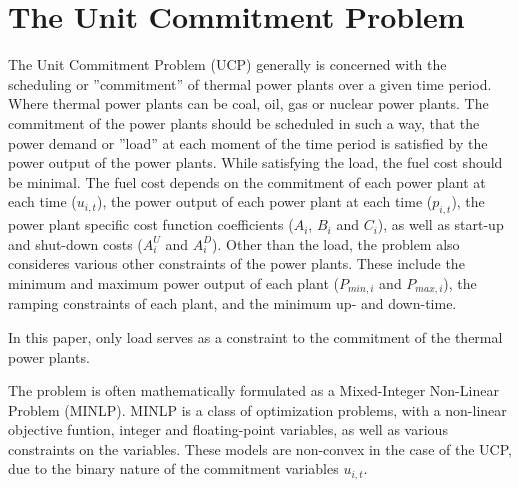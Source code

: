 \section{The Unit Commitment Problem}

The Unit Commitment Problem (UCP) generally is concerned with the scheduling or ''commitment''
of thermal power plants over a given time period.
Where thermal power plants can be coal, oil, gas or nuclear power plants.
The commitment of the power plants should be scheduled in such a way,
that the power demand or ''load'' at each moment of the time period
is satisfied by the power output of the power plants.
While satisfying the load, the fuel cost should be minimal.
The fuel cost depends on the commitment of each power plant at each time ($u_{i, t}$),
the power output of each power plant at each time ($p_{i, t}$),
the power plant specific cost function coefficients ($A_i$, $B_i$ and $C_i$),
as well as start-up and shut-down costs ($A_{i}^{U}$ and $A_{i}^{D}$).
Other than the load, the problem also consideres various other constraints of the power plants.
These include the minimum and maximum power output of each plant ($P_{min,i}$ and $P_{max,i}$),
the ramping constraints of each plant,
and the minimum up- and down-time.
\cite{Baldick1995}

In this paper, only load serves as a constraint to the commitment of the thermal power plants.


The problem is often mathematically formulated as a Mixed-Integer Non-Linear Problem (MINLP).
MINLP is a class of optimization problems, with a non-linear objective funtion, integer and floating-point variables,
as well as various constraints on the variables.
These models are non-convex in the case of the UCP, due to the binary nature of the commitment variables $u_{i, t}$.
\cite{Baldick1995, Abujarad2017}